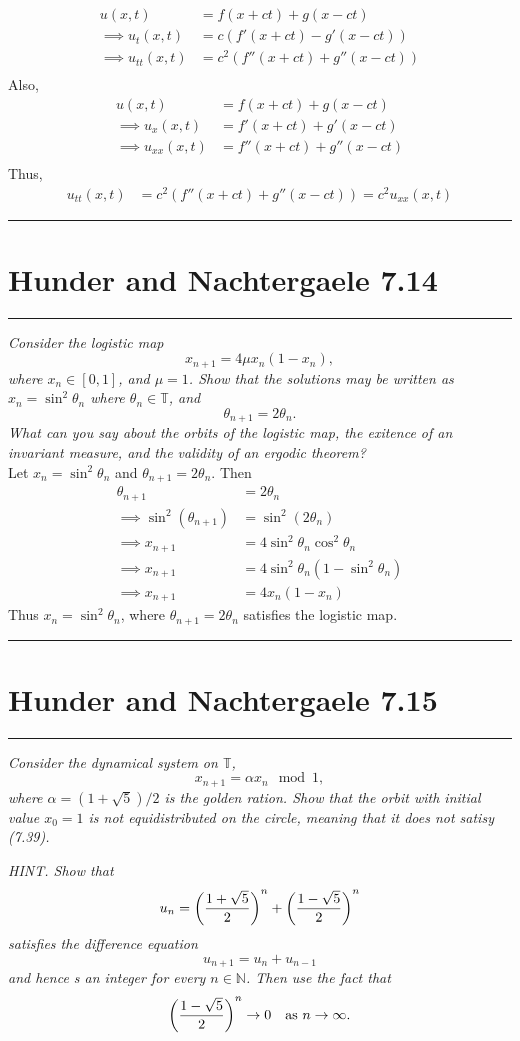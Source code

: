 \documentclass{article} %
\theoremstyle{plain}
\newcommand{\problem}[1]{
\vspace{.375cm}
\begin{minipage}{\textwidth}
    \begin{center}
        \noindent\rule{5cm}{1pt}
    \end{center}
    \section{\bf #1}
    \begin{center}
        \noindent\rule{5cm}{1pt}
    \end{center}
    \vspace{0.25cm}
\end{minipage}
}
\numberwithin{equation}{section} %
\numberwithin{figure}{section} %
\numberwithin{table}{section} %
\begin{document}
\begin{align*}
    u(x,t) &= f(x + ct) + g(x - ct) \\
    \implies u_t(x,t) &= c (f'(x + ct) - g'(x - ct)) \\
    \implies u_{tt}(x,t) &= c^2 (f''(x + ct) + g''(x - ct)) \\
\end{align*}
Also,
\begin{align*}
    u(x,t) &= f(x + ct) + g(x - ct) \\
    \implies u_x(x,t) &= f'(x + ct) + g'(x - ct) \\
    \implies u_{xx}(x,t) &= f''(x + ct) + g''(x - ct) \\
\end{align*}
Thus,
\begin{align*}
    u_{tt}(x,t) &= c^2 (f''(x + ct) + g''(x - ct)) = c^2 u_{xx}(x,t)
\end{align*}

\problem{Hunder and Nachtergaele 7.14}
\emph{Consider the logistic map $$x_{n+1} = 4\mu x_n(1 - x_n),$$ where $x_n \in [0,1]$, and $\mu = 1$.  Show that the solutions may be written as $x_n = \sin^2\theta_n$ where $\theta_n \in \mathbb{T}$, and $$\theta_{n+1} = 2\theta_n.$$  What can you say about the orbits of the logistic map, the exitence of an invariant measure, and the validity of an ergodic theorem?} \\

Let $x_n = \sin^2 \theta_n$ and $\theta_{n+1} = 2\theta_n$.  Then
\begin{align*}
    \theta_{n+1} &= 2\theta_n \\
    \implies \sin^2(\theta_{n+1}) &= \sin^2(2\theta_n) \\
    \implies x_{n+1} &= 4\sin^2\theta_n\cos^2\theta_n \\
    \implies x_{n+1} &= 4\sin^2\theta_n(1 - \sin^2\theta_n) \\
    \implies x_{n+1} &= 4x_n(1 - x_n)
\end{align*}
Thus $x_n = \sin^2 \theta_n$, where $\theta_{n+1} = 2\theta_n$
satisfies the logistic map.

\problem{Hunder and Nachtergaele 7.15}
\emph{Consider the dynamical system on $\mathbb{T}$, $$x_{n+1} = \alpha x_n \mod 1,$$ where $\alpha = (1 + \sqrt{5})/2$ is the golden ration.  Show that the orbit with initial value $x_0 = 1$ is not equidistributed on the circle, meaning that it does not satisy (7.39).}

\emph{HINT.  Show that $$u_n = \qty(\frac{1 + \sqrt{5}}{2})^n + \qty(\frac{1 - \sqrt{5}}{2})^n$$ satisfies the difference equation $$u_{n+1} = u_n + u_{n-1}$$ and hence s an integer for every $n \in \mathbb{N}$.  Then use the fact that $$\qty(\frac{1 - \sqrt{5}}{2})^n \rightarrow 0\ \ \text{ as } n \rightarrow \infty.$$}
\end{document}
